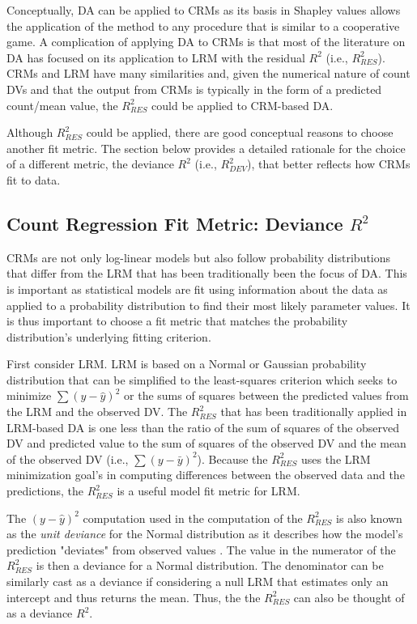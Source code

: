 \documentclass[ShortAfour,times,sageapa]{sagej}
\begin{document}
	Conceptually, DA can be applied to CRMs as its basis in Shapley values allows the application of the method to any procedure that is similar to a cooperative game.
	A complication of applying DA to CRMs is that most of the literature on DA has focused on its application to LRM with the residual $R^2$ (i.e., $R^2_{RES}$).
	CRMs and LRM have many similarities and, given the numerical nature of count DVs and that the output from CRMs is typically in the form of a predicted count/mean value, the $R^2_{RES}$ could be applied to CRM-based DA.
	
	Although $R^2_{RES}$ could be applied, there are good conceptual reasons to choose another fit metric. 
	The section below provides a detailed rationale for the choice of a different metric, the deviance $R^2$ (i.e., $R^2_{DEV}$), that better reflects how CRMs fit to data. 
	
	\subsection{Count Regression Fit Metric: Deviance $R^2$}
	
	CRMs are not only log-linear models but also follow probability distributions that differ from the LRM that has been traditionally been the focus of DA.
	This is important as statistical models are fit using information about the data as applied to a probability distribution to find their most likely parameter values.
	It is thus important to choose a fit metric that matches the probability distribution's underlying fitting criterion.
	
	First consider LRM.
	LRM is based on a Normal or Gaussian probability distribution that can be simplified to the	least-squares criterion which seeks to minimize $\sum (y - \hat{y})^2$ or the sums of squares between the predicted values from the LRM and the observed DV.
	The $R^2_{RES}$ that has been traditionally applied in LRM-based DA is one less than the ratio of the sum of squares of the observed DV and predicted value to the sum of squares of the observed DV and the mean of the observed DV (i.e., $\sum (y - \bar{y})^2$).
	Because the $R^2_{RES}$ uses the LRM minimization goal's in computing differences between the observed data and the predictions, the $R^2_{RES}$ is a useful model fit metric for LRM.
	
	The $(y - \hat{y})^2$ computation used in the computation of the $R^2_{RES}$ is also known as the \emph{unit deviance} for the Normal distribution as it describes how the model's prediction "deviates" from observed values \cite{mccullagh2019generalized}.
	The value in the numerator of the $R^2_{RES}$ is then a deviance for a Normal distribution.
	The denominator can be similarly cast as a deviance if considering a null LRM that estimates only an intercept and thus returns the mean.
	Thus, the the $R^2_{RES}$ can also be thought of as a deviance $R^2$.
	
\end{document}

